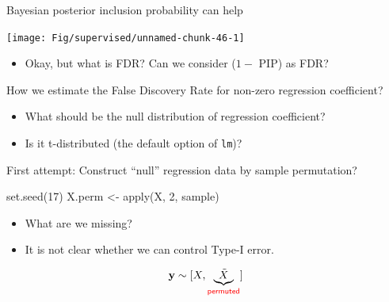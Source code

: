 \documentclass[
  ignorenonframetext,
  aspectratio=169]{beamer}
\newenvironment{Shaded}{\begin{snugshade}}{\end{snugshade}}
\newcommand{\DecValTok}[1]{\textcolor[rgb]{0.00,0.00,0.81}{#1}}
\newcommand{\FunctionTok}[1]{\textcolor[rgb]{0.00,0.00,0.00}{#1}}
\newcommand{\NormalTok}[1]{#1}
\newcommand{\OtherTok}[1]{\textcolor[rgb]{0.56,0.35,0.01}{#1}}
\providecommand{\tightlist}{%
  \setlength{\itemsep}{0pt}\setlength{\parskip}{0pt}}
\begin{document}
\begin{frame}{Bayesian posterior inclusion probability can help}
\protect\hypertarget{bayesian-posterior-inclusion-probability-can-help}{}
\scriptsize

\normalsize

\scriptsize

\begin{center}\texttt{[image: Fig/supervised/unnamed-chunk-46-1]} \end{center}

\normalsize

\begin{itemize}
\tightlist
\item
  Okay, but what is FDR? Can we consider (\(1-\) PIP) as FDR?
\end{itemize}
\end{frame}

\begin{frame}[fragile]{How we estimate the False Discovery Rate for
non-zero regression coefficient?}
\protect\hypertarget{how-we-estimate-the-false-discovery-rate-for-non-zero-regression-coefficient}{}
\Large

\begin{itemize}
\item
  What should be the null distribution of regression coefficient?
\item
  Is it t-distributed (the default option of \texttt{lm})?
\end{itemize}
\end{frame}

\begin{frame}[fragile]{First attempt: Construct ``null'' regression data
by sample permutation?}
\protect\hypertarget{first-attempt-construct-null-regression-data-by-sample-permutation}{}
\large

\begin{Shaded}
\begin{Highlighting}[]
\FunctionTok{set.seed}\NormalTok{(}\DecValTok{17}\NormalTok{)}
\NormalTok{X.perm }\OtherTok{\textless{}{-}} \FunctionTok{apply}\NormalTok{(X, }\DecValTok{2}\NormalTok{, sample)}
\end{Highlighting}
\end{Shaded}

\normalsize

\scriptsize

\normalsize

\Large

\begin{itemize}
\item
  What are we missing?
\item
  It is not clear whether we can control Type-I error.
\end{itemize}

\[\mathbf{y} \sim [X, \underbrace{\tilde{X}}_{\textsf{\color{red} permuted}}]\]
\end{frame}
\end{document}
